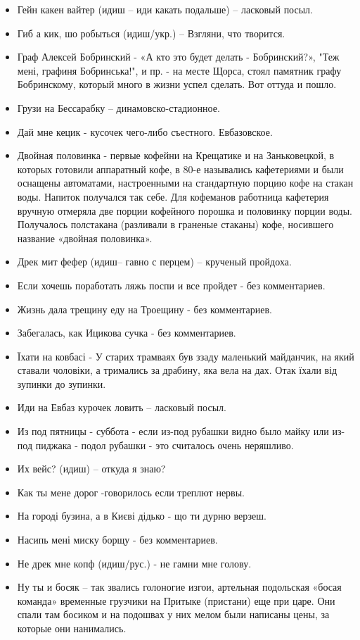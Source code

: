 \begin{itemize}
\item  Гейн какен вайтер (идиш – иди какать подальше) – ласковый посыл.
\item  Гиб а кик, шо робыться (идиш/укр.) – Взгляни, что творится.
\item  Граф Алексей Бобринский - «А кто это будет делать - Бобринский?», "Теж мені, графиня Бобринська!", и пр. - на месте Щорса, стоял памятник графу Бобринскому, который много в жизни успел сделать. Вот оттуда и пошло.
\item  Грузи на Бессарабку – динамовско-стадионное.
\item  Дай мне кецик - кусочек чего-либо съестного. Евбазовское.
\item  Двойная половинка - первые кофейни на Крещатике и на Заньковецкой, в которых готовили аппаратный кофе, в 80-е назывались кафетериями и были оснащены автоматами, настроенными на стандартную порцию кофе на стакан воды. Напиток получался так себе. Для кофеманов работница кафетерия вручную отмеряла две порции кофейного порошка и половинку порции воды. Получалось полстакана (разливали в граненые стаканы) кофе, носившего название «двойная половинка». 
\item  Дрек мит фефер (идиш– гавно с перцем) – крученый пройдоха. 
\item  Если хочешь поработать ляжь поспи и все пройдет - без комментариев.
\item  Жизнь дала трещину еду на Троещину - без комментариев.
\item  Забегалась, как Ицикова сучка - без комментариев.
\item  Їхати на ковбасі  - У старих трамваях був ззаду маленький майданчик, на який ставали чоловіки, а тримались за драбину, яка вела на дах. Отак їхали від зупинки до зупинки.
\item  Иди на Евбаз курочек ловить – ласковый посыл.
\item  Из под пятницы - суббота - если из-под рубашки видно было майку или из-под пиджака - подол рубашки - это считалось очень неряшливо.
\item  Их вейс? (идиш) – откуда я знаю?
\item  Как ты мене дорог -говорилось если треплют  нервы.
\item  На городі бузина, а в Києві дідько - що ти дурню верзеш.
\item  Насипь мені миску борщу - без комментариев.
\item  Не дрек мне копф (идиш/рус.) - не гамни мне голову. 
\item  Ну ты и босяк – так звались голоногие изгои, артельная подольская «босая команда» временные грузчики на Притыке (пристани) еще при царе. Они спали там босиком и на подошвах у них мелом были написаны цены, за которые они нанимались.

\end{itemize}
